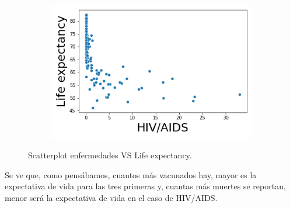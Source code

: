 \begin{itemize}
\begin{figure}[H]
\begin{subfigure}{0.2\linewidth}
              \end{subfigure}
                \hfill
                \begin{subfigure}{0.2\linewidth}
                \centering
                \includegraphics[width=\textwidth]{img/8.png}
              \end{subfigure}
               \caption{Scatterplot enfermedades VS Life expectancy.}
               	
               \label{fig: 5}
        \end{figure}
    \end{itemize}

Se ve que, como pensábamos, cuantos más vacunados hay, mayor es la expectativa de vida para las tres primeras y, cuantas más muertes se reportan, menor será la expectativa de vida en el caso de HIV/AIDS.

